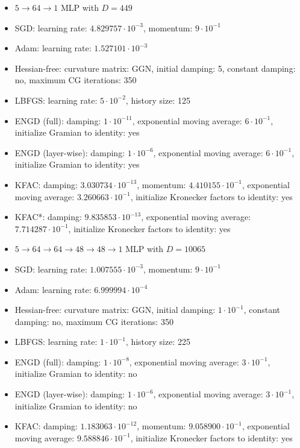 \documentclass[10pt]{article}
\begin{document}
\begin{itemize}
  \item $5 \rightarrow 64 \rightarrow 1$ MLP with $D=449$
  \item SGD: learning rate: $4.829757 \cdot 10^{-3}$, momentum: $9 \cdot 10^{-1}$
  \item Adam: learning rate: $1.527101 \cdot 10^{-3}$
  \item Hessian-free: curvature matrix: GGN, initial damping: 5, constant damping: no, maximum CG iterations: 350
  \item LBFGS: learning rate: $5 \cdot 10^{-2}$, history size: 125
  \item ENGD (full): damping: $1 \cdot 10^{-11}$, exponential moving average: $6 \cdot 10^{-1}$, initialize Gramian to identity: yes
  \item ENGD (layer-wise): damping: $1 \cdot 10^{-6}$, exponential moving average: $6 \cdot 10^{-1}$, initialize Gramian to identity: yes
  \item KFAC: damping: $3.030734 \cdot 10^{-13}$, momentum: $4.410155 \cdot 10^{-1}$, exponential moving average: $3.260663 \cdot 10^{-1}$, initialize Kronecker factors to identity: yes
  \item KFAC*: damping: $9.835853 \cdot 10^{-13}$, exponential moving average: $7.714287 \cdot 10^{-1}$, initialize Kronecker factors to identity: yes
  \item $5 \rightarrow 64 \rightarrow 64 \rightarrow 48 \rightarrow 48 \rightarrow 1$ MLP with $D=10065$
  \item SGD: learning rate: $1.007555 \cdot 10^{-3}$, momentum: $9 \cdot 10^{-1}$
  \item Adam: learning rate: $6.999994 \cdot 10^{-4}$
  \item Hessian-free: curvature matrix: GGN, initial damping: $1 \cdot 10^{-1}$, constant damping: no, maximum CG iterations: 350
  \item LBFGS: learning rate: $1 \cdot 10^{-1}$, history size: 225
  \item ENGD (full): damping: $1 \cdot 10^{-8}$, exponential moving average: $3 \cdot 10^{-1}$, initialize Gramian to identity: no
  \item ENGD (layer-wise): damping: $1 \cdot 10^{-6}$, exponential moving average: $3 \cdot 10^{-1}$, initialize Gramian to identity: no
  \item KFAC: damping: $1.183063 \cdot 10^{-12}$, momentum: $9.058900 \cdot 10^{-1}$, exponential moving average: $9.588846 \cdot 10^{-1}$, initialize Kronecker factors to identity: yes

\end{itemize}
\end{document}
